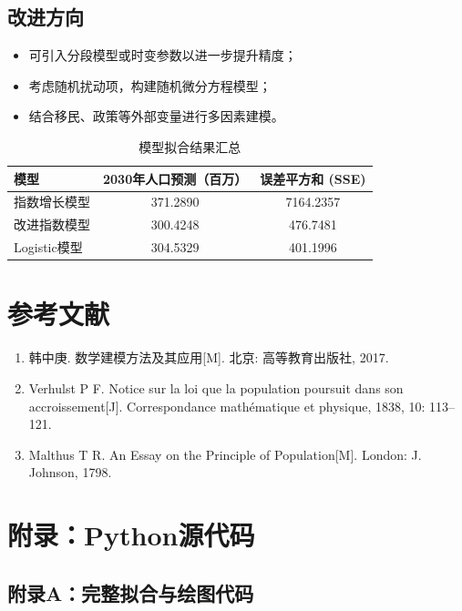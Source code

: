\documentclass[12pt]{ctexart}
\begin{document}
\subsection{改进方向}
\begin{itemize}
    \item 可引入分段模型或时变参数以进一步提升精度；
    \item 考虑随机扰动项，构建随机微分方程模型；
    \item 结合移民、政策等外部变量进行多因素建模。
\end{itemize}

\begin{table}[H]
\centering
\caption{模型拟合结果汇总}
\label{tab:results}
\begin{tabular}{lcc}
\toprule
模型 & 2030年人口预测（百万） & 误差平方和 (SSE) \\
\midrule
指数增长模型 & 371.2890 & 7164.2357 \\
改进指数模型 & 300.4248 & 476.7481 \\
Logistic模型 & 304.5329 & 401.1996 \\
\bottomrule
\end{tabular}
\end{table}

\section*{参考文献}
\begin{enumerate}
    \item 韩中庚. 数学建模方法及其应用[M]. 北京: 高等教育出版社, 2017.
    \item Verhulst P F. Notice sur la loi que la population poursuit dans son accroissement[J]. Correspondance mathématique et physique, 1838, 10: 113–121.
    \item Malthus T R. An Essay on the Principle of Population[M]. London: J. Johnson, 1798.
\end{enumerate}

\appendix
\section*{附录：Python源代码}
\subsection*{附录A：完整拟合与绘图代码}
\end{document}
